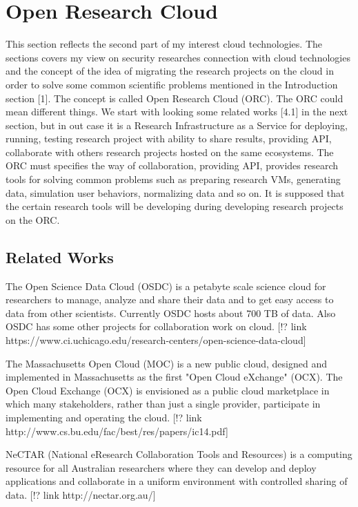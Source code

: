 %


\section{Open Research Cloud}
This section reflects the second part of my interest cloud technologies. The sections covers my view on security researches connection with cloud technologies and the concept of the idea of migrating the research projects on the cloud in order to solve some common scientific problems mentioned in the Introduction section [1]. The concept is called Open Research Cloud (ORC). The ORC could mean different things. We start with looking some related works [4.1] in the next section, but in out case it is a Research Infrastructure as a Service for deploying, running, testing research project with ability to share results, providing API, collaborate with others research projects hosted on the same ecosystems. The ORC must specifies the way of collaboration, providing API, provides research tools for solving common problems such as preparing research VMs, generating data, simulation user behaviors, normalizing data and so on. It is supposed that the certain research tools will be developing during developing research projects on the ORC.  

\subsection{Related Works}
The Open Science Data Cloud (OSDC) is a petabyte scale science cloud for researchers to manage, analyze and share their data and to get easy access to data from other scientists. Currently OSDC hosts about 700 TB of data. Also OSDC has some other projects for collaboration work on cloud. [!? link https://www.ci.uchicago.edu/research-centers/open-science-data-cloud]

The Massachusetts Open Cloud (MOC) is a new public cloud, designed and implemented in Massachusetts as the first "Open Cloud eXchange" (OCX). The Open Cloud Exchange (OCX) is envisioned as a public cloud marketplace in which many stakeholders, rather than just a single provider, participate in implementing and operating the cloud. [!? link http://www.cs.bu.edu/fac/best/res/papers/ic14.pdf]

NeCTAR (National eResearch Collaboration Tools and Resources) is a computing resource for all Australian researchers where they can develop and deploy applications and collaborate in a uniform environment with controlled sharing of data. [!? link http://nectar.org.au/]



